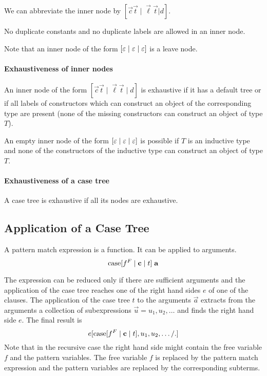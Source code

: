 We can abbreviate the inner node by $[\vec c\vec t \mid \vec\ell \vec t | d]$.


No duplicate constants and no duplicate labels are allowed in an inner node.

Note that an inner node of the form $[\varepsilon \mid \varepsilon \mid \varepsilon]$ is
a leave node.



\paragraph{Exhaustiveness of inner nodes}
%

An inner node of the form $[\vec c \vec t \mid \vec\ell \vec t \mid d]$ is
exhaustive if it has a default tree or if all labels of constructors which can
construct an object of the corresponding type are present (none of the missing
constructors can construct an object of type $T$).

An empty inner node of the form $[\varepsilon \mid \varepsilon \mid \varepsilon]$ is
possible if $T$ is an inductive type and none of the constructors of the
inductive type can construct an object of type $T$.


\paragraph{Exhaustiveness of a case tree}
%
A case tree is exhaustive if all its nodes are exhaustive.






\subsection{Application of a Case Tree}

A pattern match expression is a function. It can be applied to arguments.
$$
    {\text{case}} [f^F \mid {\mathbf c} \mid t]\; {\mathbf a}
$$

The expression can be reduced only if there are sufficient arguments and the
application of the case tree reaches one of the right hand sides $e$ of one of
the clauses. The application of the case tree $t$ to the arguments $\vec a$
extracts from the arguments a collection of subexpressions $\vec u = u_1, u_2,
\ldots$ and finds the right hand side $e$. The final result is
$$
    e[{\text{case}}[f^F\mid {\mathbf c} \mid t], u_1, u_2, \ldots /.]
$$
Note that in the recursive case the right hand side might contain the free
variable $f$ and the pattern variables. The free variable $f$ is replaced by the
pattern match expression and the pattern variables are replaced by the
corresponding subterms.

